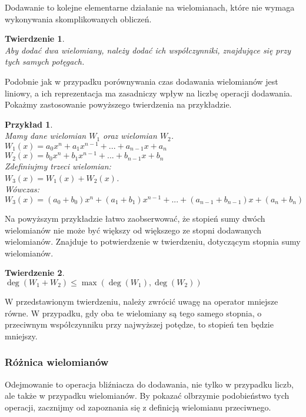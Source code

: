 \documentclass[twoside,a4paper]{book}
\newtheorem{theorem}{Twierdzenie}
\newtheorem{example}{Przykład}
\begin{document}
Dodawanie to kolejne elementarne działanie na wielomianach, które nie wymaga wykonywania skomplikowanych obliczeń.

\begin{theorem}
	$ $\\
	Aby dodać dwa wielomiany, należy dodać ich współczynniki, znajdujące się przy tych samych potęgach.
\end{theorem}

Podobnie jak w przypadku porównywania czas dodawania wielomianów jest liniowy, a ich reprezentacja ma zasadniczy wpływ na liczbę operacji dodawania. Pokażmy zastosowanie powyższego twierdzenia na przykładzie.

\begin{example}
	$ $\\
	Mamy dane wielomian $W_1$ oraz wielomian $W_2$. \\
	$W_1(x) = a_0x^n + a_1x^{n-1} + ... + a_{n-1}x + a_n$ \\
	$W_2(x) = b_0x^n + b_1x^{n-1} + ... + b_{n-1}x + b_n$ \\
	Zdefiniujmy trzeci wielomian: \\
	$W_3(x) = W_1(x) + W_2(x)$. \\
	Wówczas: \\
	$W_3(x) = (a_0+b_0)x^n + (a_1+b_1)x^{n-1} + ... + (a_{n-1} + b_{n-1})x + (a_n + b_n)$ \\
\end{example}

Na powyższym przykładzie łatwo zaobserwować, że stopień sumy dwóch wielomianów nie może być większy od większego ze stopni dodawanych wielomianów. Znajduje to potwierdzenie w twierdzeniu, dotyczącym stopnia sumy wielomianów.

\begin{theorem}
$ $\\
$\deg(W_1 + W_2) \le \max(\deg(W_1),\deg (W_2))$
\end{theorem}

W przedstawionym twierdzeniu, należy zwrócić uwagę na operator mniejsze równe. W przypadku, gdy oba te wielomiany są tego samego stopnia, o przeciwnym współczynniku przy najwyższej potędze, to stopień ten będzie mniejszy.

\subsubsection{Różnica wielomianów}

Odejmowanie to operacja bliźniacza do dodawania, nie tylko w przypadku liczb, ale także w przypadku wielomianów. By pokazać olbrzymie podobieństwo tych operacji, zacznijmy od zapoznania się z definicją wielomianu przeciwnego.
\end{document}
